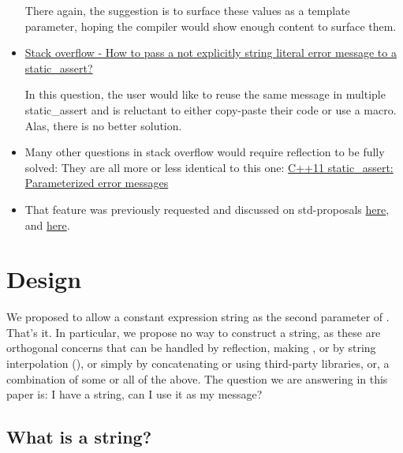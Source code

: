 \documentclass{wg21}
\begin{document}
\begin{itemize}
There again, the suggestion is to surface these values as a template parameter, hoping the compiler would show enough content to surface them.

\item \href{https://stackoverflow.com/questions/57501016/how-to-pass-a-not-explicitly-string-literal-error-message-to-a-static-assert}{Stack overflow - How to pass a not explicitly string literal error message to a static_assert?}

In this question, the user would like to reuse the same message in multiple static_assert and is reluctant to either copy-paste their code or use a macro.
Alas, there is no better solution.


\item Many other questions in stack overflow would require reflection to be fully solved:
They are all more or less identical to this one:
\href{https://stackoverflow.com/questions/11050511/c11-static-assert-parameterized-error-messages}{C++11 static_assert: Parameterized error messages}

\item That feature was previously requested and discussed on std-proposals \href{https://lists.isocpp.org/std-proposals/2019/07/0155.php}{here}, and \href{https://groups.google.com/a/isocpp.org/g/std-proposals/c/eKNlsA4Vd-M}{here}.

\end{itemize}
\section{Design}

We proposed to allow a constant expression string as the second parameter of .
That's it. In particular, we propose no way to construct a string, as these are orthogonal concerns that can be
handled by reflection, making  , or by string interpolation (), or simply by concatenating  or using third-party libraries, or, a combination of some or all of the above.
The question we are answering in this paper is: I have a string, can I use it as my  message?

\subsection{What is a string?}
\end{document}
